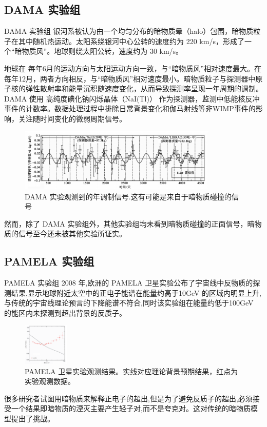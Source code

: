 \documentclass{beamer} %
\begin{document}
\subsection{DAMA 实验组}

\begin{frame}{DAMA 实验组}
银河系被认为由一个均匀分布的暗物质晕（halo）包围，暗物质粒子在其中随机热运动。太阳系绕银河中心公转的速度约为 220 km/s，形成了一个“暗物质风”。地球则绕太阳公转，速度约为 30 km/s。

地球在 每年6月的运动方向与太阳运动方向一致，与“暗物质风”相对速度最大。在 每年12月，两者方向相反，与“暗物质风”相对速度最小。暗物质粒子与探测器中原子核的弹性散射率和能量沉积随速度变化，从而导致探测率呈现一年周期的调制。DAMA 使用 高纯度碘化钠闪烁晶体（NaI(Tl)） 作为探测器，监测中低能核反冲事件的计数率。数据处理过程中排除日常背景变化和伽马射线等非WIMP事件的影响，关注随时间变化的微弱周期信号。
\end{frame}

\begin{frame}
\begin{figure}[!htbp]
    \centering    
    \includegraphics[height=3cm]{Img/4-1.png}
    \caption{DAMA 实验观测到的年调制信号.这有可能是来自于暗物质碰撞的信号 }
    \label{4-1}
\end{figure}

然而，除了 DAMA 实验组外，其他实验组均未看到暗物质碰撞的正面信号，暗物质的信号至今还未被其他实验所证实。
\end{frame}

\subsection{PAMELA 实验组}

\begin{frame}{PAMELA 实验组}
2008 年,欧洲的 PAMELA 卫星实验公布了宇宙线中反物质的探测结果,显示地球附近太空中的正电子能谱在能量约高于10GeV 的区域内明显上升,与传统的宇宙线理论预言的下降能谱不符合,同时该实验组在能量约低于100GeV 的能区内未探测到超出背景的反质子。

\begin{figure}[!htbp]
    \centering    
    \includegraphics[height=2cm]{Img/4-2.png}
    \caption{PAMELA 卫星实验观测结果。实线对应理论背景预期结果，红点为实验观测数据。 }
    \label{4-2}
\end{figure}

很多研究者试图用暗物质来解释正电子的超出,但是为了避免反质子的超出,必须接受一个结果即暗物质的湮灭主要产生轻子对,而不是夸克对。这对传统的暗物质模型提出了挑战。
\end{frame}
\end{document}
